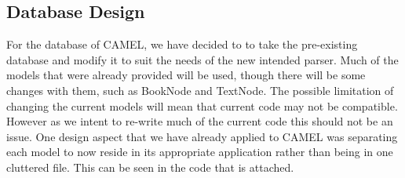 \subsection{Database Design}
	For the database of CAMEL, we have decided to to take the pre-existing database and modify it to suit the needs of the new intended parser. Much of the models that were already provided will be used, though there will be some changes with them, such as BookNode and TextNode. The possible limitation of changing the current models will mean that current code may not be compatible. However as we intent to re-write much of the current code this should not be an issue. One design aspect that we have already applied to CAMEL was separating each model to now reside in its appropriate application rather than being in one cluttered file. This can be seen in the code that is attached.\\ 
	
